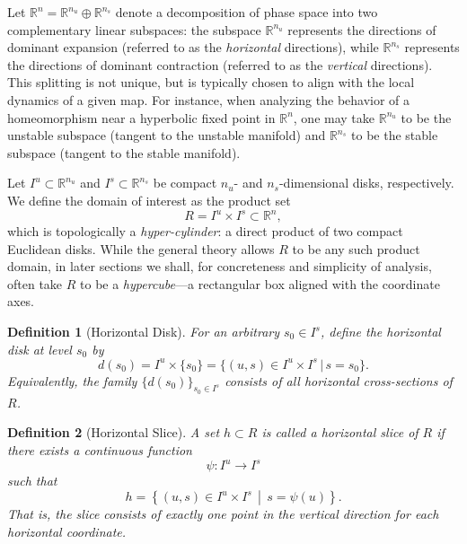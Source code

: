 \documentclass[12pt]{iopart}
\newtheorem{definition}{Definition}[section]
\begin{document}
Let \( \mathbb{R}^n = \mathbb{R}^{n_u} \oplus \mathbb{R}^{n_s} \) denote a decomposition of phase space into two complementary linear subspaces: the subspace \( \mathbb{R}^{n_u} \) represents the directions of dominant expansion (referred to as the \emph{horizontal} directions), while \( \mathbb{R}^{n_s} \) represents the directions of dominant contraction (referred to as the \emph{vertical} directions). This splitting is not unique, but is typically chosen to align with the local dynamics of a given map. For instance, when analyzing the behavior of a homeomorphism near a hyperbolic fixed point in \( \mathbb{R}^n \), one may take \( \mathbb{R}^{n_u} \) to be the unstable subspace (tangent to the unstable manifold) and \( \mathbb{R}^{n_s} \) to be the stable subspace (tangent to the stable manifold).

Let \( I^u \subset \mathbb{R}^{n_u} \) and \( I^s \subset \mathbb{R}^{n_s} \) be compact \( n_u \)- and \( n_s \)-dimensional disks, respectively. We define the domain of interest as the product set
\begin{equation}\label{eq:R definition}
R = I^u \times I^s \subset \mathbb{R}^n,
\end{equation}
which is topologically a \emph{hyper-cylinder}: a direct product of two compact Euclidean disks. While the general theory allows \( R \) to be any such product domain, in later sections we shall, for concreteness and simplicity of analysis, often take \( R \) to be a \emph{hypercube}—a rectangular box aligned with the coordinate axes.

\begin{definition}[Horizontal Disk]\label{Horizontal disk definition}
For an arbitrary \(s_0 \in I^s\), define the \emph{horizontal disk at level \(s_0\)} by
\[
d(s_0) = I^u \times \{s_0\}
= \bigl\{ (u,s) \in I^u \times I^s \,\big|\, s = s_0 \bigr\}.
\]
Equivalently, the family \(\{d(s_0)\}_{s_0 \in I^s}\) consists of all horizontal cross-sections of \(R\).
\end{definition}

\begin{definition}[Horizontal Slice]\label{Horizontal slice definition}
A set \( h \subset R \) is called a \emph{horizontal slice of \( R \)} if there exists a continuous function
\[
\psi : I^u \to I^s
\]
such that
\[
h = \left\{ (u, s) \in I^u \times I^s \,\middle|\, s = \psi(u) \right\}.
\]
That is, the slice consists of exactly one point in the vertical direction for each horizontal coordinate.
\end{definition}
\end{document}
